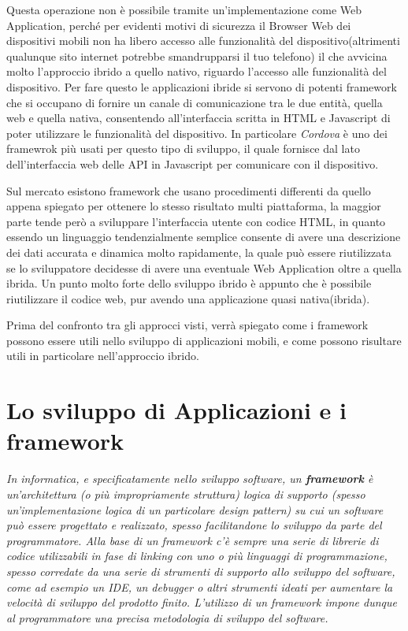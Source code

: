 Questa operazione non è possibile tramite un'implementazione come Web Application, perché per evidenti motivi di sicurezza il Browser Web dei dispositivi mobili non ha libero accesso alle funzionalità del dispositivo(altrimenti qualunque sito internet potrebbe smandrupparsi il tuo telefono) il che avvicina molto l'approccio ibrido a quello nativo, riguardo l'accesso alle funzionalità del dispositivo. Per fare questo le applicazioni ibride si servono di potenti framework che si occupano di fornire un canale di comunicazione tra le due entità, quella web e quella nativa, consentendo all'interfaccia scritta in HTML e Javascript di poter utilizzare le funzionalità del dispositivo. In particolare \emph{Cordova} è uno dei framewrok più usati per questo tipo di sviluppo, il quale fornisce dal lato dell'interfaccia web delle API in Javascript per comunicare con il dispositivo.

Sul mercato esistono framework che usano procedimenti differenti da quello appena spiegato per ottenere lo stesso risultato multi piattaforma, la maggior parte tende però a sviluppare l'interfaccia utente con codice
HTML, in quanto essendo un linguaggio tendenzialmente semplice consente di avere una descrizione dei dati accurata e dinamica molto rapidamente, la quale può essere riutilizzata se lo sviluppatore decidesse di avere una eventuale Web Application oltre a quella ibrida. Un punto molto forte dello sviluppo ibrido è appunto che è possibile riutilizzare il codice web, pur avendo una applicazione quasi nativa(ibrida).  

Prima del confronto tra gli approcci visti, verrà spiegato come i framework possono essere utili nello sviluppo di applicazioni mobili, e come possono risultare utili in particolare nell'approccio ibrido.

\section{Lo sviluppo di Applicazioni e i framework}
\label{sec:appAndFramework}
\textit{In informatica, e specificatamente nello sviluppo software, un \textbf{framework} è un'architettura (o più impropriamente struttura) logica di supporto (spesso un'implementazione logica di un particolare design pattern) su cui un software può essere progettato e realizzato, spesso facilitandone lo sviluppo da parte del programmatore. Alla base di un framework c'è sempre una serie di librerie di codice utilizzabili in fase di linking con uno o più linguaggi di programmazione, spesso corredate da una serie di strumenti di supporto allo sviluppo del software, come ad esempio un IDE, un debugger o altri strumenti ideati per aumentare la velocità di sviluppo del prodotto finito. L'utilizzo di un framework impone dunque al programmatore una precisa metodologia di sviluppo del software.}\\
\hspace*{\fill}\cite{wiki:framework}

